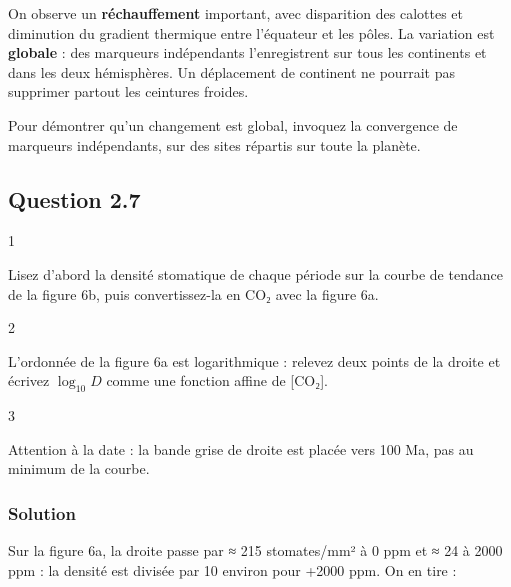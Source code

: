 \documentclass[11pt,a4paper]{article}
\begin{document}
On observe un \textbf{réchauffement} important, avec disparition des calottes et diminution du gradient thermique entre l'équateur et les pôles. La variation est \textbf{globale} : des marqueurs indépendants l'enregistrent sur tous les continents et dans les deux hémisphères. Un déplacement de continent ne pourrait pas supprimer partout les ceintures froides.

\begin{methode}

Pour démontrer qu'un changement est global, invoquez la convergence de marqueurs indépendants, sur des sites répartis sur toute la planète.

\end{methode}

\hypertarget{question-2.7}{%
\subsection{Question 2.7}\label{question-2.7}}

\begin{indication}{1}

Lisez d'abord la densité stomatique de chaque période sur la courbe de tendance de la figure 6b, puis convertissez-la en CO₂ avec la figure 6a.

\end{indication}

\begin{indication}{2}

L'ordonnée de la figure 6a est logarithmique : relevez deux points de la droite et écrivez \(\log_{10} D\) comme une fonction affine de {[}CO₂{]}.

\end{indication}

\begin{indication}{3}

Attention à la date : la bande grise de droite est placée vers 100 Ma, pas au minimum de la courbe.

\end{indication}

\hypertarget{solution-17}{%
\subsubsection{Solution}\label{solution-17}}

Sur la figure 6a, la droite passe par ≈ 215 stomates/mm² à 0 ppm et ≈ 24 à 2000 ppm : la densité est divisée par 10 environ pour +2000 ppm. On en tire :
\end{document}
